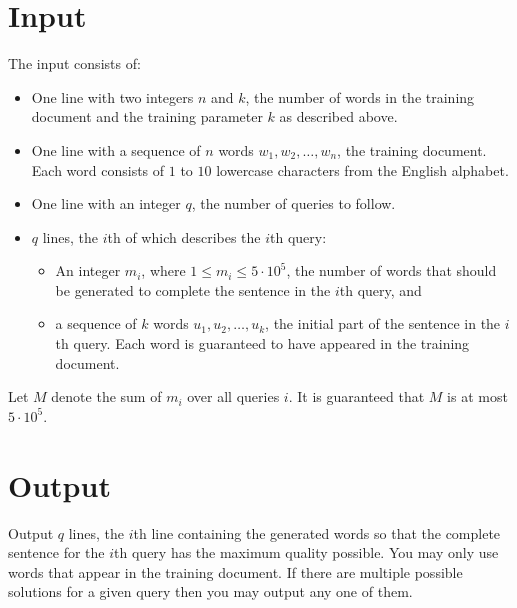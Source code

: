 \section*{Input}
The input consists of:
\begin{itemize}
  \item One line with two integers $n$ and $k$, the number of words in the training document and the training
        parameter $k$ as described above.
  \item One line with a sequence of $n$ words $w_1, w_2, \ldots, w_n$, the training document.
        Each word consists of $1$ to $10$ lowercase characters from the English alphabet.
  \item One line with an integer $q$, the number of queries to follow.
  \item $q$ lines, the $i$th of which describes the $i$th query:
    \begin{itemize}
      \item An integer $m_i$, where $1 \leq m_i \leq 5 \cdot 10^5$, the number of words that
            should be generated to complete the sentence in the $i$th query, and
      \item a sequence of $k$ words $u_1, u_2, \ldots, u_k$, the initial part of
            the sentence in the $i$th query.
            Each word is guaranteed to have appeared in the training document.
    \end{itemize}
\end{itemize}

Let $M$ denote the sum of $m_i$ over all queries $i$. It is guaranteed that $M$
is at most $5 \cdot 10^5$.

\section*{Output}
Output $q$ lines, the $i$th line containing the generated words so that the
complete sentence for the $i$th query has the maximum quality possible. You may
only use words that appear in the training document. If there are multiple
possible solutions for a given query then you may output any one of them.


